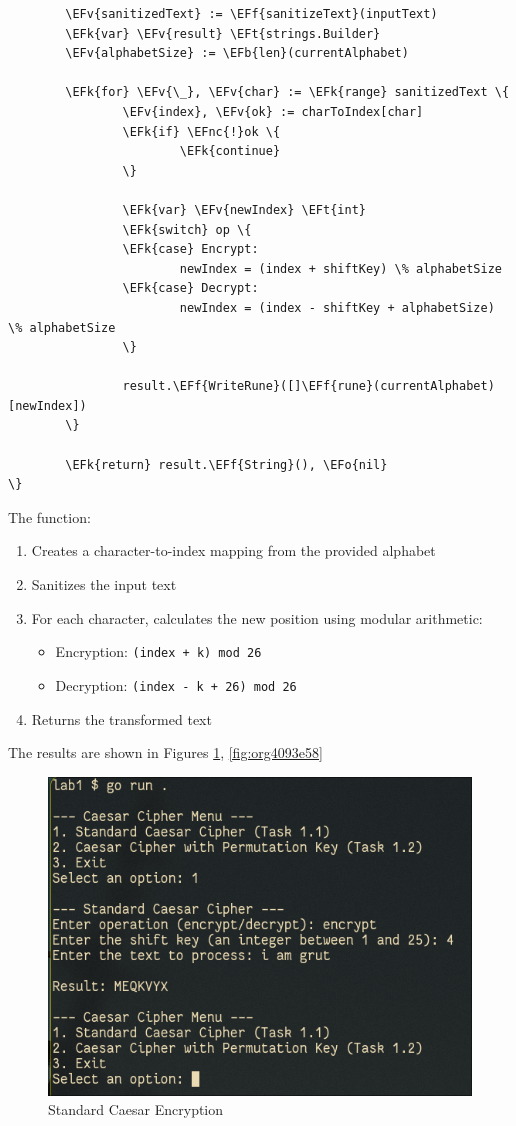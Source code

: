 \documentclass[a4paper,12pt]{article}
\newcommand{\EFk}[1]{\textcolor{EFk}{#1}} %
\newcommand{\EFb}[1]{\textcolor{EFb}{#1}} %
\newcommand{\EFf}[1]{\textcolor{EFf}{#1}} %
\newcommand{\EFv}[1]{\textcolor{EFv}{#1}} %
\newcommand{\EFt}[1]{\textcolor{EFt}{#1}} %
\newcommand{\EFo}[1]{\textcolor{EFo}{#1}} %
\newcommand{\EFnc}[1]{#1} %
\begin{document}
\begin{enumerate}
\begin{Code}
\begin{Verbatim}
        \EFv{sanitizedText} := \EFf{sanitizeText}(inputText)
        \EFk{var} \EFv{result} \EFt{strings.Builder}
        \EFv{alphabetSize} := \EFb{len}(currentAlphabet)

        \EFk{for} \EFv{\_}, \EFv{char} := \EFk{range} sanitizedText \{
                \EFv{index}, \EFv{ok} := charToIndex[char]
                \EFk{if} \EFnc{!}ok \{
                        \EFk{continue}
                \}

                \EFk{var} \EFv{newIndex} \EFt{int}
                \EFk{switch} op \{
                \EFk{case} Encrypt:
                        newIndex = (index + shiftKey) \% alphabetSize
                \EFk{case} Decrypt:
                        newIndex = (index - shiftKey + alphabetSize) \% alphabetSize
                \}

                result.\EFf{WriteRune}([]\EFf{rune}(currentAlphabet)[newIndex])
        \}

        \EFk{return} result.\EFf{String}(), \EFo{nil}
\}
\end{Verbatim}
\end{Code}
The function:
\begin{enumerate}
\item Creates a character-to-index mapping from the provided alphabet
\item Sanitizes the input text
\item For each character, calculates the new position using modular arithmetic:
\begin{itemize}
\item Encryption: \texttt{(index + k) mod 26}
\item Decryption: \texttt{(index - k + 26) mod 26}
\end{itemize}
\item Returns the transformed text
\end{enumerate}

The results are shown in Figures \ref{fig:org06489fa}, \ref{fig:org4093e58}
\begin{figure}[htbp]
\centering
\includegraphics[width=.9\linewidth]{./results/caesar_enc.png}
\caption{\label{fig:org06489fa}Standard Caesar Encryption}
\end{figure}


\end{enumerate}
\end{document}
